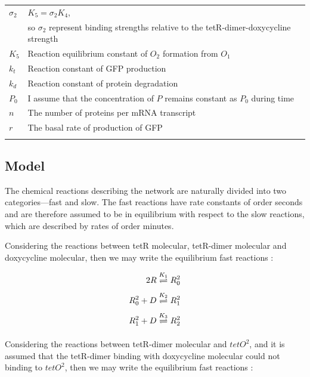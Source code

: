 \begin{table}[H]
\begin{tabular}{l l}
$\sigma_{2}$ & 
$K_{5} = \sigma_{2} K_{4}$, \\ &so $\sigma_{2}$ represent binding strengths relative to the tetR-dimer-doxycycline strength \\
$K_{5}$ & 
Reaction equilibrium constant of $O_{2}$ formation from $O_{1}$\\
$k_{t}$ & 
Reaction constant of GFP production\\
$k_{d}$ & 
Reaction constant of protein degradation\\
$P_{0}$ & 
I assume that the concentration of $P$ remains constant as $P_{0}$ during time\\
$n$ & 
The number of proteins per mRNA transcript\\
$r$ & 
The basal rate of production of GFP\\
\bottomrule\\
\end{tabular}
\end{table}
\newpage

\subsection{Model}
The chemical reactions describing the network are naturally divided into two categories—fast and slow. The fast reactions have rate constants of order seconds and are therefore assumed to be in equilibrium with respect to the slow reactions, which are described by rates of order minutes.

Considering the reactions between tetR molecular, tetR-dimer molecular and doxycycline molecular, then we may write the equilibrium fast reactions :

\begin{equation} 
\begin{aligned} 
\centering
2R         &\underset{}{\overset{K_1}{\rightleftharpoons}} R^2_0 \\ 
R^2_0 + D  &\underset{}{\overset{K_2}{\rightleftharpoons}} R^2_1 \\ 
R^2_1 + D  &\underset{}{\overset{K_3}{\rightleftharpoons}} R^2_2 \\  
\end{aligned} 
\end{equation}

Considering the reactions between tetR-dimer molecular and $tetO^{2}$, and it is assumed that the tetR-dimer binding with doxycycline molecular could not binding to $tetO^{2}$, then we may write the equilibrium fast reactions :

